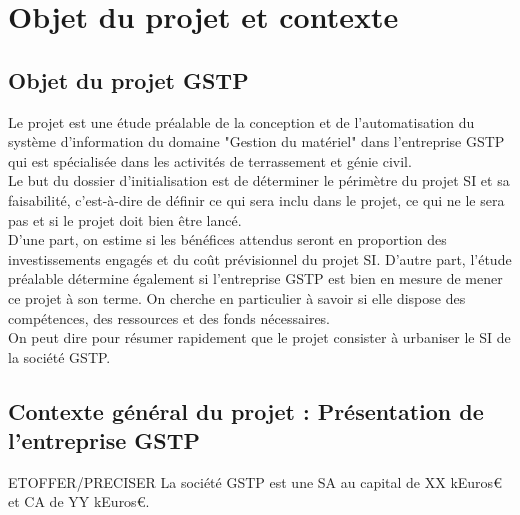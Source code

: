 \documentclass[12pt]{article}
\begin{document}
\maketitle


\section{Objet du projet et contexte}

\subsection{Objet du projet GSTP}
Le projet est une étude préalable de la conception et de l'automatisation
du système d'information du domaine "Gestion du matériel" dans l'entreprise 
GSTP qui est spécialisée dans les activités de terrassement et génie civil.\\

Le but du dossier d'initialisation est de déterminer le périmètre du projet
SI et sa faisabilité, c’est-à-dire de définir ce qui sera inclu
dans le projet, ce qui ne le sera pas et si le projet doit bien être
lancé.\\

D’une part, on estime si les bénéfices attendus seront en proportion des
investissements engagés et du coût prévisionnel du projet SI.  D’autre
part, l’étude préalable détermine également si l’entreprise GSTP est
bien en mesure de mener ce projet à son terme. On cherche en particulier
à savoir si elle dispose des compétences, des ressources et des fonds
nécessaires.\\

On peut dire pour résumer rapidement que le projet consister à urbaniser le
SI de la société GSTP.


\subsection{Contexte général du projet : Présentation de l'entreprise GSTP}

ETOFFER/PRECISER
La société GSTP est une SA au capital de XX kEuros€ et CA de YY kEuros€.
\end{document}

